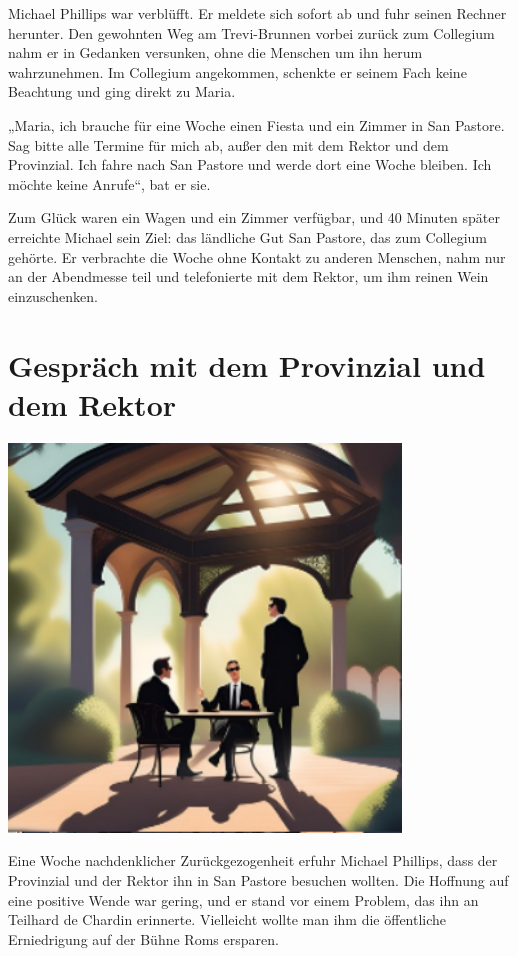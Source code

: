 \documentclass[
]{article}
\begin{document}
Michael Phillips war verblüfft. Er meldete sich sofort ab und fuhr
seinen Rechner herunter. Den gewohnten Weg am Trevi-Brunnen vorbei
zurück zum Collegium nahm er in Gedanken versunken, ohne die Menschen um
ihn herum wahrzunehmen. Im Collegium angekommen, schenkte er seinem Fach
keine Beachtung und ging direkt zu Maria.

„Maria, ich brauche für eine Woche einen Fiesta und ein Zimmer in San
Pastore. Sag bitte alle Termine für mich ab, außer den mit dem Rektor
und dem Provinzial. Ich fahre nach San Pastore und werde dort eine Woche
bleiben. Ich möchte keine Anrufe``, bat er sie.

Zum Glück waren ein Wagen und ein Zimmer verfügbar, und 40 Minuten
später erreichte Michael sein Ziel: das ländliche Gut San Pastore, das
zum Collegium gehörte. Er verbrachte die Woche ohne Kontakt zu anderen
Menschen, nahm nur an der Abendmesse teil und telefonierte mit dem
Rektor, um ihm reinen Wein einzuschenken.

\section{Gespräch mit dem Provinzial und dem
Rektor}\label{gespruxe4ch-mit-dem-provinzial-und-dem-rektor}

\includegraphics[width=4.11093in,height=4.06457in]{media/image4.png}

Eine Woche nachdenklicher Zurückgezogenheit erfuhr Michael Phillips,
dass der Provinzial und der Rektor ihn in San Pastore besuchen wollten.
Die Hoffnung auf eine positive Wende war gering, und er stand vor einem
Problem, das ihn an Teilhard de Chardin erinnerte. Vielleicht wollte man
ihm die öffentliche Erniedrigung auf der Bühne Roms ersparen.
\end{document}
